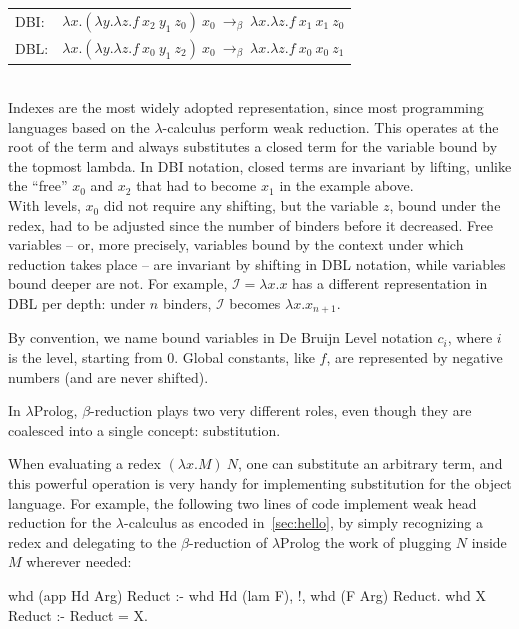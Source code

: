 \documentclass[a4paper, 11pt]{book}
\begin{document}
\noindent
\begin{tabular}{ll}
DBI: & $\lambda x.(\lambda y.\lambda z.f\ x_2\ y_1\ z_0)\ x_0\ \to_\beta\ \lambda x.\lambda z.f\ x_1\ x_1\ z_0$\\
DBL: & $\lambda x.(\lambda y.\lambda z.f\ x_0\ y_1\ z_2)\ x_0\ \to_\beta\ \lambda x.\lambda z.f\ x_0\ x_0\ z_1$\\
\end{tabular}
~\\


Indexes are the most widely adopted representation, since most programming
languages based on the $\lambda$-calculus perform weak reduction. This
operates at the root of the term and always substitutes a closed term for the
variable bound by the topmost lambda. In DBI notation, closed terms are
invariant by lifting, unlike the ``free'' $x_0$ and $x_2$ that had to become
$x_1$ in the example above.\\
With levels, $x_0$ did not require any shifting, but the variable $z$, bound
under the redex, had to be adjusted since the number of binders before it
decreased. Free variables -- or, more precisely, variables bound by the context
under which reduction takes place -- are invariant by shifting in DBL notation,
while variables bound deeper are not. For example, $\mathcal{I} = \lambda x.x$
has a different representation in DBL per depth: under $n$ binders,
$\mathcal{I}$ becomes $\lambda x.x_{n+1}$.


By convention, we name bound variables in De Bruijn Level notation $c_i$, where
$i$ is the level, starting from $0$. Global constants, like $f$, are
represented by negative numbers (and are never shifted).


In $\lambda$Prolog, $\beta$-reduction plays two very different roles, even
though they are coalesced into a single concept: substitution.


When evaluating a redex $(\lambda x.M)\ N$, one can substitute an arbitrary
term, and this powerful operation is very handy for implementing substitution
for the object language. For example, the following two lines of code
implement weak head reduction for the $\lambda$-calculus as encoded
in~\cref{sec:hello}, by simply recognizing a redex and delegating to the
$\beta$-reduction of $\lambda$Prolog the work of plugging $N$ inside $M$
wherever needed:

\begin{elpicode}
whd (app Hd Arg) Reduct :- whd Hd (lam F), !, whd (F Arg) Reduct.
whd X Reduct :- Reduct = X.
\end{elpicode}
\end{document}
